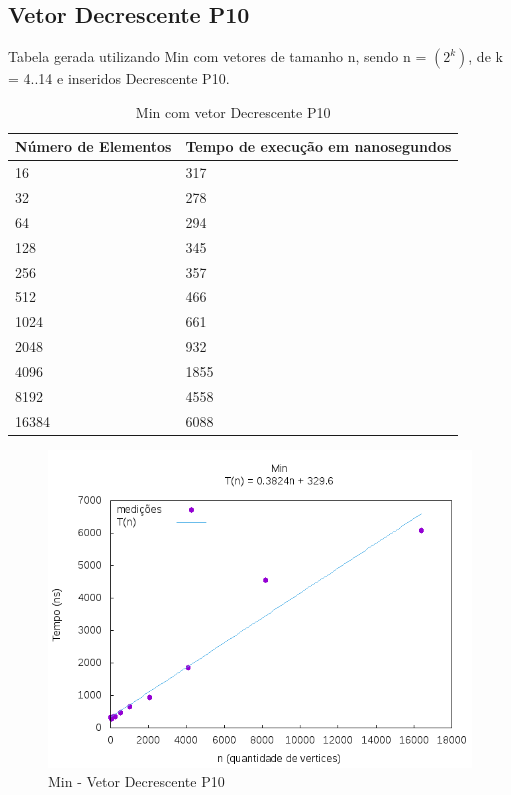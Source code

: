 \documentclass[12pt,a4paper,twoside]{report}
\begin{document}
\subsection{Vetor Decrescente P10}
Tabela gerada utilizando Min com vetores de tamanho n, sendo n = $(2^k)$, de k = 4..14 e inseridos Decrescente P10.
\begin{table}[H]
\centering
\caption{Min com vetor Decrescente P10}
\label{my-label}
\begin{tabular}{|l|l|}
\hline
\multicolumn{1}{|c|}{\textbf{Número de Elementos}} & \multicolumn{1}{c|}{\textbf{Tempo de execução em nanosegundos}} \\ \hline
16 & 317 \\ \hline
32 & 278 \\ \hline
64 & 294 \\ \hline
128 & 345 \\ \hline
256 & 357 \\ \hline
512 & 466 \\ \hline
1024 & 661 \\ \hline
2048 & 932 \\ \hline
4096 & 1855 \\ \hline
8192 & 4558 \\ \hline
16384 & 6088 \\ \hline

\end{tabular}
\end{table}

\begin{figure}[H]
    \centering
    \includegraphics[width=0.7\linewidth]{graficos/Min/Decrescente P10/Min.png}
  \caption{Min - Vetor Decrescente P10}
\end{figure}
\end{document}
